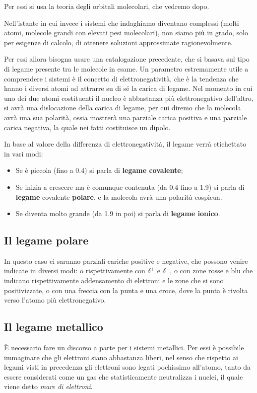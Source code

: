 Per essi si usa la teoria degli orbitali molecolari, che vedremo dopo.

Nell'istante in cui invece i sistemi che indaghiamo diventano complessi (molti atomi, molecole grandi con elevati pesi molecolari), non siamo più in grado, solo per esigenze di calcolo, di ottenere soluzioni approssimate ragionevolmente.

Per essi allora bisogna usare una catalogazione precedente, che si basava sul tipo di legame presente tra le molecole in esame.
Un parametro estremamente utile a comprendere i sistemi è il concetto di elettronegatività, che è la tendenza che hanno i diversi atomi ad attrarre su di sé la carica di legame. Nel momento in cui uno dei due atomi costituenti il nucleo è abbastanza più elettronegativo dell'altro, si avrà una dislocazione della carica di legame, per cui diremo che la molecola avrà una sua polarità, ossia mostrerà una parziale carica positiva e una parziale carica negativa, la quale nei fatti costituisce un dipolo.

In base al valore della differenza di elettronegatività, il legame verrà etichettato in vari modi:
\begin{itemize}
    \item Se è piccola (fino a 0.4) si parla di \textbf{legame covalente};
    \item Se inizia a crescere ma è comunque contenuta (da 0.4 fino a 1.9) si parla di \textbf{legame} covalente \textbf{polare}, e la molecola avrà una polarità cospicua. 
    \item Se diventa molto grande (da 1.9 in poi) si parla di \textbf{legame ionico}.
\end{itemize} 

\subsection{Il legame polare}
In questo caso ci saranno parziali cariche positive e negative, che possono venire indicate in diversi modi: o rispettivamente con $\delta^+$ e $\delta^-$, o con zone rosse e blu che indicano rispettivamente addensamento di elettroni e le zone che si sono positivizzate, o con una freccia con la punta e una croce, dove la punta è rivolta verso l'atomo più elettronegativo.

\subsection{Il legame metallico}
È necessario fare un discorso a parte per i sistemi metallici. Per essi è possibile immaginare che gli elettroni siano abbastanza liberi, nel senso che rispetto ai legami visti in precedenza gli elettroni sono legati pochissimo all'atomo, tanto da essere considerati come un gas che statisticamente neutralizza i nuclei, il quale viene detto \textit{mare di elettroni}.

